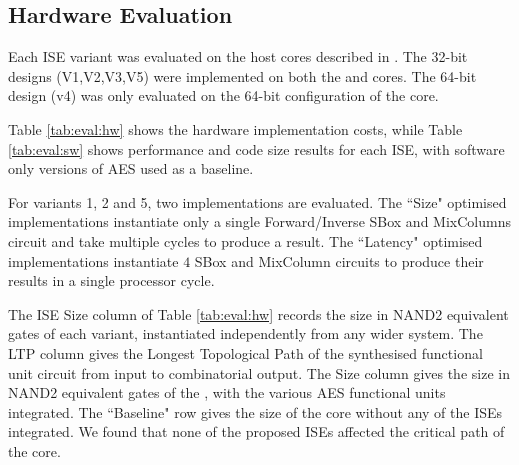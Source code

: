 
\subsection{Hardware Evaluation}
\label{sec:eval:sw}

Each ISE variant was evaluated on the host cores
described in .
The 32-bit designs (V1,V2,V3,V5) were implemented on both the
 and  cores.
The 64-bit design (v4) was only evaluated on the 64-bit configuration
of the  core.

Table \ref{tab:eval:hw}
shows the hardware implementation costs, while
Table \ref{tab:eval:sw}
shows performance and code size results for
each ISE, with software only versions of AES used as a baseline.

For variants 1, 2 and 5, two implementations are evaluated.
The ``Size" optimised implementations instantiate only a single
Forward/Inverse SBox and MixColumns circuit and take multiple cycles
to produce a result.
The ``Latency" optimised implementations instantiate $4$ SBox and
MixColumn circuits to produce their results in a single processor cycle.

The ISE Size column of Table \ref{tab:eval:hw} 
records the size in NAND2 equivalent gates of each variant,
instantiated independently from any wider system.
The LTP column gives the Longest Topological Path of the synthesised
functional unit circuit from input to combinatorial output.
The  Size column gives the size in NAND2 equivalent gates of the
, with the various AES functional units integrated.
The ``Baseline" row gives the size of the core without any of the
ISEs integrated.
We found that none of the proposed ISEs affected the critical
path of the  core.


